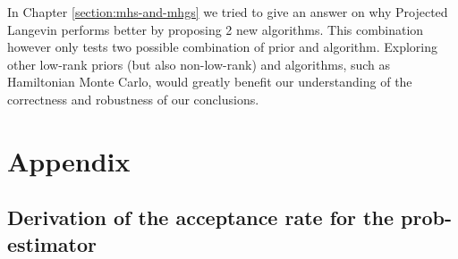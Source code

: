 \documentclass[12pt]{memoir}
\begin{document}
In Chapter \ref{section:mhs-and-mhgs} we tried to give an answer on why Projected Langevin performs better by proposing 2 new algorithms. This combination however only tests two possible combination of prior and algorithm. Exploring other low-rank priors (but also non-low-rank) and algorithms, such as Hamiltonian Monte Carlo, would greatly benefit our understanding of the correctness and robustness of our conclusions.  

% 
% 
\printbibliography

\chapter*{Appendix}
\section*{Derivation of the acceptance rate for the prob-estimator}\label{section:appendix:acc-rate-prob}
\end{document}
